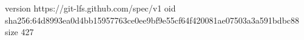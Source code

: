 version https://git-lfs.github.com/spec/v1
oid sha256:64d8993ea0d4bb15957763ce0ee9bf9e55cf64f420081ae07503a3a591bdbc88
size 427
